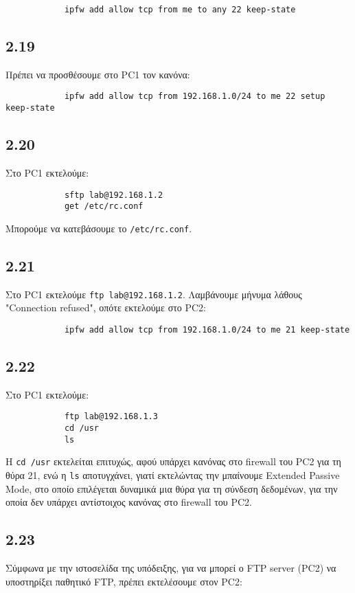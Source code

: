\documentclass[a4paper, 12pt]{article}
\begin{document}
		\begin{verbatim}
			ipfw add allow tcp from me to any 22 keep-state
		\end{verbatim}

	\subsection*{2.19}
		Πρέπει να προσθέσουμε στο PC1 τον κανόνα:
		
		\begin{verbatim}
			ipfw add allow tcp from 192.168.1.0/24 to me 22 setup keep-state
		\end{verbatim}

	\subsection*{2.20}
		Στο PC1 εκτελούμε:
		
		\begin{verbatim}
			sftp lab@192.168.1.2
			get /etc/rc.conf
		\end{verbatim}
		
		Μπορούμε να κατεβάσουμε το \verb|/etc/rc.conf|.

	\subsection*{2.21}
		Στο PC1 εκτελούμε \verb|ftp lab@192.168.1.2|. Λαμβάνουμε μήνυμα λάθους "Connection refused", οπότε εκτελούμε στο PC2:
		
		\begin{verbatim}
			ipfw add allow tcp from 192.168.1.0/24 to me 21 keep-state 
		\end{verbatim}

	\subsection*{2.22}
		Στο PC1 εκτελούμε:
		
		\begin{verbatim}
			ftp lab@192.168.1.3
			cd /usr
			ls
		\end{verbatim}
		
		Η \verb|cd /usr| εκτελείται επιτυχώς, αφού υπάρχει κανόνας στο firewall του PC2 για τη θύρα 21, ενώ η \verb|ls| αποτυγχάνει, γιατί εκτελώντας την μπαίνουμε Extended Passive Mode, στο οποίο επιλέγεται δυναμικά μια θύρα για τη σύνδεση δεδομένων, για την οποία δεν υπάρχει αντίστοιχος κανόνας στο firewall του PC2.

	\subsection*{2.23}
		Σύμφωνα με την ιστοσελίδα της υπόδειξης, για να μπορεί ο FTP server (PC2) να υποστηρίξει παθητικό FTP, πρέπει εκτελέσουμε στον PC2:
						
\end{document}
